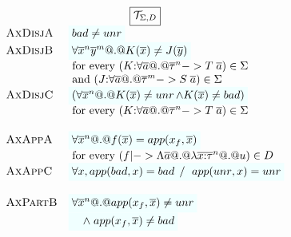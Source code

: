 \documentclass[preprint,nocopyrightspace]{sigplanconf}
\begin{document}
\begin{figure}\small
\[\begin{array}{c}
\ruleform{\Th{\Sigma}{D}} \\ 
\begin{array}{lll} 
 \textsc{AxDisjA} & \formula{\bad \neq \unr}  \\ 
 \textsc{AxDisjB} & \formula{\forall \oln{x}{n}\oln{y}{m} @.@ K(\ol{x}) \neq J(\ol{y})} \\ 
                  & \text{ for every } (K{:}\forall\as @.@ \oln{\tau}{n} -> T\;\as) \in \Sigma \\ 
                  & \text{ and } (J{:}\forall\as @.@ \oln{\tau}{m} -> S\;\as) \in \Sigma \\
 \textsc{AxDisjC} & \formula{(\forall \oln{x}{n} @.@ K(\ol{x}) \neq \unr \land K(\ol{x}) \neq \bad)} \\ 
                  & \text{ for every } (K{:}\forall\as @.@ \oln{\tau}{n} -> T\;\as) \in \Sigma \\ \\
 \textsc{AxAppA}  & \formula{\forall \oln{x}{n} @.@ f(\ol{x}) = app(x_f,\xs)} \\
                  & \text{ for every } (f |-> \Lambda\as @.@ \lambda\oln{x{:}\tau}{n} @.@ u) \in D \\
 \textsc{AxAppC}  & \formula{\forall x, app(\bad,x) = \bad \; /\ \; app(\unr,x) = \unr}    \\ \\
 \textsc{AxPartB} & \formula{\forall \oln{x}{n} @.@ app(x_f,\xs) \neq \unr} \\
                  & \formula{\quad\land\; app(x_f,\xs) \neq \bad} \\

\end{array}
\end{array}\]
\end{figure}
\end{document}
